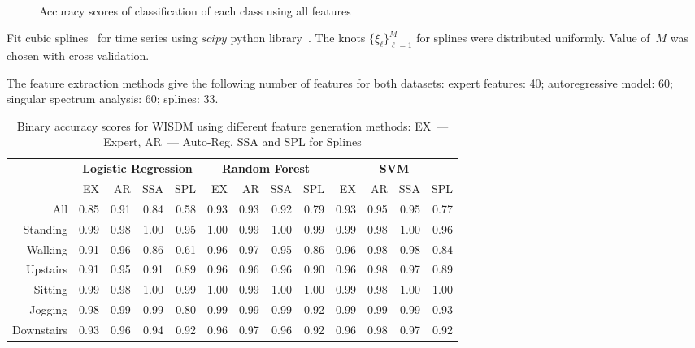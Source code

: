 \documentclass{llncs}
\begin{document}
\begin{figure}[!h]
	\\
	\caption{Accuracy scores of classification of each class using all features}
	\label{fig::feature_union_results}
\end{figure}

Fit cubic splines~\cite{deboor1978splines} for time series using $scipy$ python library~\cite{scipy}. 
The knots $\{\xi_{\ell}\}_{\ell = 1}^M$ for splines were distributed uniformly. 
Value of~$M$ was chosen with cross validation. 

The feature extraction methods give the following number of features for both datasets: expert features: 40; autoregressive model: 60; singular spectrum analysis: 60; splines: 33.

\begin{table}[!h]
	\centering
	\caption{Binary accuracy scores for WISDM using different feature generation methods: EX~--- Expert, AR~--- Auto-Reg, SSA and  SPL for Splines}
	\footnotesize
	\begin{tabular}{r|rrrr|rrrr|rrrr|}
		& \multicolumn{4}{c|}{\textbf{Logistic Regression}} & \multicolumn{4}{c|}{\textbf{Random Forest}} & \multicolumn{4}{c|}{\textbf{SVM}}          \\ \cline{2-13} 
		& EX   & AR   & SSA   & SPL  & EX  & AR & SSA & SPL & EX & AR & SSA & SPL \\ \hline
		All& 0.85 & 0.91 & 0.84 & 0.58 & 0.93 & 0.93 & 0.92 & 0.79 & 0.93 & 0.95 & 0.95 & 0.77 \\
		Standing& 0.99 & 0.98 & 1.00 & 0.95 & 1.00 & 0.99 & 1.00 & 0.99 & 0.99 & 0.98 & 1.00 & 0.96 \\
		Walking& 0.91 & 0.96 & 0.86 & 0.61 & 0.96 & 0.97 & 0.95 & 0.86 & 0.96 & 0.98 & 0.98 & 0.84 \\
		Upstairs& 0.91 & 0.95 & 0.91 & 0.89 & 0.96 & 0.96 & 0.96 & 0.90 & 0.96 & 0.98 & 0.97 & 0.89 \\
		Sitting& 0.99 & 0.98 & 1.00 & 0.99 & 1.00 & 0.99 & 1.00 & 1.00 & 0.99 & 0.98 & 1.00 & 1.00 \\
		Jogging& 0.98 & 0.99 & 0.99 & 0.80 & 0.99 & 0.99 & 0.99 & 0.92 & 0.99 & 0.99 & 0.99 & 0.93 \\
		Downstairs& 0.93 & 0.96 & 0.94 & 0.92 & 0.96 & 0.97 & 0.96 & 0.92 & 0.96 & 0.98 & 0.97 & 0.92 \\ \hline
	\end{tabular}
	\label{tbl::wisdm_methods_results}
\end{table}
\end{document}
